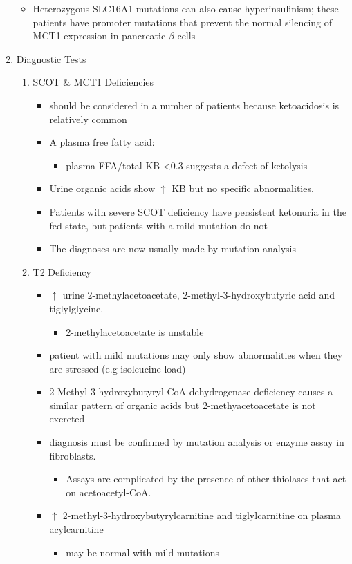 \documentclass{scrartcl}
\begin{document}
\begin{enumerate}
\begin{itemize}
\item Heterozygous SLC16A1 mutations can also cause hyperinsulinism;
these patients have promoter mutations that prevent the normal
silencing of MCT1 expression in pancreatic \(\beta\)-cells
\end{itemize}

\item Diagnostic Tests
\label{sec:org00b2b1f}
\begin{enumerate}
\item SCOT \& MCT1 Deficiencies
\label{sec:org17842c8}
\begin{itemize}
\item should be considered in a number of patients because ketoacidosis is relatively common
\item A plasma free fatty acid:
\begin{itemize}
\item plasma FFA/total KB <0.3 suggests a defect of ketolysis
\end{itemize}
\item Urine organic acids show \(\uparrow\) KB but no specific abnormalities.
\item Patients with severe SCOT deficiency have persistent ketonuria in
the fed state, but patients with a mild mutation do not
\item The diagnoses are now usually made by mutation analysis
\end{itemize}
\item T2 Deficiency
\label{sec:orgfcc0cb3}
\begin{itemize}
\item \(\uparrow\) urine 2-methylacetoacetate, 2-methyl-3-hydroxybutyric acid
and tiglylglycine.
\begin{itemize}
\item 2-methylacetoacetate is unstable
\end{itemize}
\item patient with mild mutations may only show abnormalities when they
are stressed (e.g isoleucine load)
\item 2-Methyl-3-hydroxybutyryl-CoA dehydrogenase deficiency causes a
similar pattern of organic acids but 2-methyacetoacetate is not excreted
\item diagnosis must be confirmed by mutation analysis or enzyme assay in fibroblasts.
\begin{itemize}
\item Assays are complicated by the presence of other thiolases that act
on acetoacetyl-CoA.
\end{itemize}
\item \(\uparrow\) 2-methyl-3-hydroxybutyrylcarnitine and
tiglylcarnitine on plasma acylcarnitine
\begin{itemize}
\item may be normal with mild mutations
\end{itemize}
\end{itemize}
\end{enumerate}


\end{enumerate}
\end{document}
